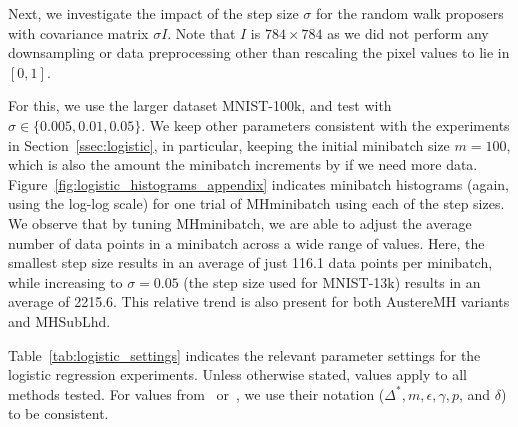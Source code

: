 \documentclass[letterpaper]{article}
\begin{document}
Next, we investigate the impact of the step size $\sigma$ for the random walk
proposers with covariance matrix $\sigma I$. Note that $I$ is $784\times 784$ as
we did not perform any downsampling or data preprocessing other than rescaling
the pixel values to lie in $[0,1]$.

For this, we use the larger dataset MNIST-100k, and test with $\sigma \in
\{0.005, 0.01, 0.05\}$. We keep other parameters consistent with the experiments
in Section~\ref{ssec:logistic}, in particular, keeping the initial minibatch
size $m=100$, which is also the amount the minibatch increments by if we need
more data. Figure~\ref{fig:logistic_histograms_appendix} indicates minibatch
histograms (again, using the log-log scale) for one trial of {\sc MHminibatch}
using each of the step sizes. We observe that by tuning {\sc MHminibatch}, we
are able to adjust the average number of data points in a minibatch across a
wide range of values. Here, the smallest step size results in an average of just
116.1 data points per minibatch, while increasing to $\sigma=0.05$ (the step
size used for MNIST-13k) results in an average of 2215.6. This relative trend is
also present for both {\sc AustereMH} variants and {\sc MHSubLhd}.

Table~\ref{tab:logistic_settings} indicates the relevant parameter settings for
the logistic regression experiments. Unless otherwise stated, values apply to
all methods tested. For values from~\citep{cutting_mh_2014}
or~\cite{icml2014c1_bardenet14}, we use their notation ($\Delta^*, m, \epsilon,
\gamma, p$, and $\delta$) to be consistent.
\end{document}
